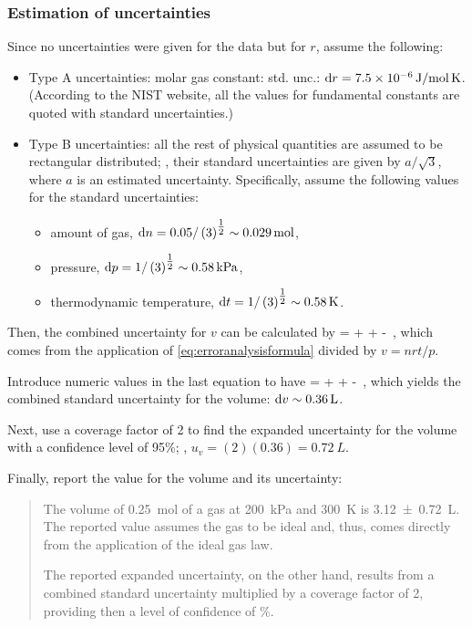 \subsubsection{Estimation of uncertainties}
Since no uncertainties were given for the data but for $r$, assume the following:
\begin{itemize}
\item Type A uncertainties: molar gas constant: std. unc.: $\dx r = \SI[scientific-notation = true]{0.0000075}{J/mol.K}$. (According to the NIST website, all the values for fundamental constants are quoted with standard uncertainties.)
%
\item Type B uncertainties: all the rest of physical quantities are assumed to be rectangular distributed; \ie, their standard uncertainties are given by $a/\sqrt{3}$, where $a$ is an estimated uncertainty. Specifically, assume the following values for the standard uncertainties:
\begin{itemize}
\item amount of gas, $\dx n = 0.05/\sqrt{3} \sim \SI{0.029}{mol}$, 
\item pressure, $\dx p = 1/\sqrt{3} \sim \SI{0.58}{kPa}$, 
\item thermodynamic temperature, $\dx t = 1/\sqrt{3} \sim \SI{0.58}{K}$.
\end{itemize}
\end{itemize}

Then, the combined uncertainty for $v$ can be calculated by
\beq
{} =  +  +  - \,,
\eeq
which comes from the application of \cref{eq:erroranalysisformula}  divided by $v = nrt/p$.

Introduce numeric values in the last equation to have
\beq
{} =  +  +  - \,,
\eeq
which yields the combined standard uncertainty for the volume: $\dx v \sim \SI{0.36}{L}$.

Next, use a coverage factor of 2 to find the expanded uncertainty for the volume with a confidence level of 95\%; \ie, $u_v = (2)(0.36) = \SI{0.72}{L}$.

Finally, report the value for the volume and its uncertainty:
\begin{quote}
The volume of \SI{0.25}{mol} of a gas at \SI{200}{kPa} and \SI{300}{K} is \SI{3.12+-0.72}{L}. The reported value assumes the gas to be ideal and, thus, comes directly from the application of the ideal gas law.

The reported expanded uncertainty, on the other hand, results from a combined standard uncertainty multiplied by a coverage factor of 2, providing then a level of confidence of \%.
\end{quote}

